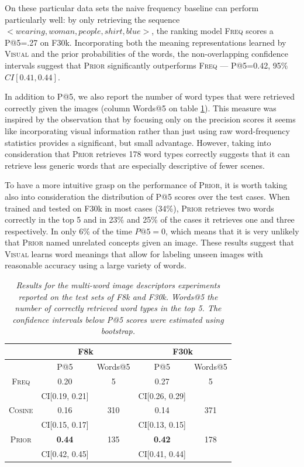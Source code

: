 On these particular data sets the naive frequency
baseline can perform particularly well: by only retrieving the
sequence $<\mathit{wearing},\mathit{woman},\mathit{people},
\mathit{shirt},\mathit{blue}>$, the ranking model \textsc{Freq} scores a P@5=.27
on F30k. Incorporating both the meaning representations learned by \textsc{Visual} and
the prior probabilities of the words, the non-overlapping
confidence intervals suggest that \textsc{Prior} significantly outperforms
\textsc{Freq} --- P@5=0.42, 95\% $CI [0.41, 0.44]$.

In addition to P@5, we also report the number of word types that
were retrieved correctly given the images (column Words@5 on table \ref{tab:precision}).
This measure was inspired by the observation that \label{rev:comined metric}
by focusing only on the precision scores it seems like
incorporating visual information rather than just using raw
word-frequency statistics provides a significant, but small
advantage. However, taking into consideration that \textsc{Prior}
retrieves 178 word types correctly suggests that it can retrieve less generic words that
are especially descriptive of fewer scenes.

\label{rev:intuitive multiword}To have a more intuitive grasp on the performance of \textsc{Prior}, it is
worth taking also into consideration the distribution of P@5 scores over the
test cases. When trained and tested on F30k in most cases (34\%), \textsc{Prior}
retrieves two words correctly in the top 5 and in 23\% and 25\% of the cases it retrieves one and
three respectively. In only 6\% of the time $P@5=0$,
which means that it is very unlikely that \textsc{Prior} named unrelated concepts
given an image.  These results suggest that \textsc{Visual} learns word meanings that
allow for labeling unseen images with reasonable accuracy using a large variety of words.

\begin{table}[h]
\centering
\begin{tabular}{|c|c|c|c|c|}
\hline
& \multicolumn{2}{|c|}{F8k} & \multicolumn{2}{|c|}{F30k} \\
\hline
 & P@5 & Words@5 & P@5 & Words@5 \\
\hline
\textsc{Freq}    & 0.20 & 5 &  0.27 &  5 \\
         &  CI[0.19, 0.21] & & CI[0.26, 0.29] & \\
\textsc{Cosine}  & 0.16 & 310 &  0.14 &  371\\
         &  CI[0.15, 0.17] & &  CI[0.13, 0.15] & \\
\textsc{Prior} & \bf{0.44}  & 135 &  \bf{0.42} & 178\\
         &  CI[0.42, 0.45] & &  CI[0.41, 0.44] &\\
\hline
\end{tabular}
\caption{\textit{Results for the multi-word image descriptors experiments
  reported on the test sets of F8k and F30k.  Words@5
  the number of correctly retrieved word types in
  the top 5. The confidence intervals below P@5 scores were
  estimated using bootstrap.}}
\label{tab:precision}
\end{table}


